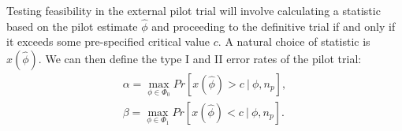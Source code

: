 \documentclass[AMA,STIX1COL]{WileyNJD-v2}
\begin{document}
Testing feasibility in the external pilot trial will involve calculating a statistic based on the pilot estimate $\hat{\phi}$ and proceeding to the definitive trial if and only if it exceeds some pre-specified  critical value $c$. A natural choice of statistic is $x(\hat{\phi})$. We can then define the type I and II error rates of the pilot trial:
\begin{align}\label{eqn:ocs}
\alpha = \max_{\phi \in \Phi_0} Pr[ x(\hat{\phi}) > c ~ | ~ \phi, n_p], \\
\beta = \max_{\phi \in \Phi_1} Pr[ x(\hat{\phi}) < c ~ | ~ \phi, n_p].
\end{align}

\end{document}

